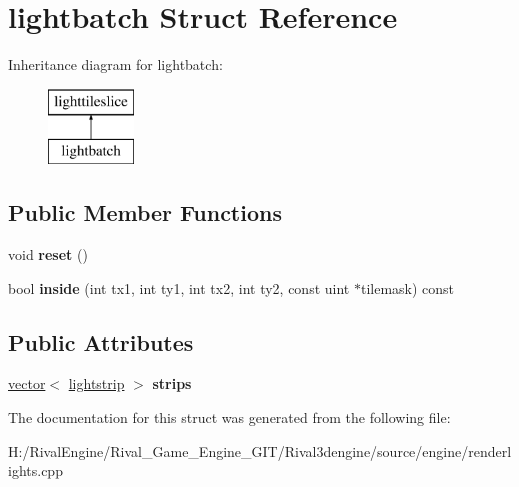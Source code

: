 \hypertarget{structlightbatch}{}\section{lightbatch Struct Reference}
\label{structlightbatch}
Inheritance diagram for lightbatch\+:\begin{figure}[H]
\begin{center}
\leavevmode
\includegraphics[height=2.000000cm]{structlightbatch}
\end{center}
\end{figure}
\subsection*{Public Member Functions}
\begin{DoxyCompactItemize}
\item 
\mbox{\label{structlightbatch_a5f9b40aa614605cc78f799f10c1831d2}} 
void {\bfseries reset} ()
\item 
\mbox{\label{structlightbatch_a0e9626f8cde40949f37154c20e3efab1}} 
bool {\bfseries inside} (int tx1, int ty1, int tx2, int ty2, const uint $\ast$tilemask) const
\end{DoxyCompactItemize}
\subsection*{Public Attributes}
\begin{DoxyCompactItemize}
\item 
\mbox{\label{structlightbatch_a44c7b828cec2c0fc5066d532ad12e7dd}} 
\hyperlink{structvector}{vector}$<$ \hyperlink{structlightstrip}{lightstrip} $>$ {\bfseries strips}
\end{DoxyCompactItemize}


The documentation for this struct was generated from the following file\+:\begin{DoxyCompactItemize}
\item 
H\+:/\+Rival\+Engine/\+Rival\+\_\+\+Game\+\_\+\+Engine\+\_\+\+G\+I\+T/\+Rival3dengine/source/engine/renderlights.\+cpp\end{DoxyCompactItemize}

